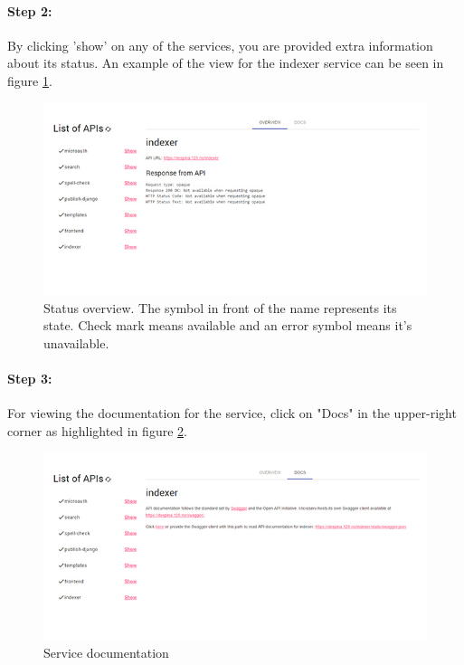 \paragraph{Step 2:} By clicking 'show' on any of the services, you are provided extra information about its status. An example of the view for the indexer service can be seen in figure \ref{fig:manual11}.

\begin{figure}[H]
    \centering
    \includegraphics[scale=0.70]{fig/userManual/11}
    \caption{Status overview. The symbol in front of the name represents its state. Check mark means available and an error symbol means it's unavailable.}
    \label{fig:manual11}
\end{figure}

\paragraph{Step 3:} For viewing the documentation for the service, click on "Docs" in the upper-right corner as highlighted in figure \ref{fig:manual12}.

\begin{figure}[H]
    \centering
    \includegraphics[scale=0.70]{fig/userManual/12}
    \caption{Service documentation}
    \label{fig:manual12} 
\end{figure}
